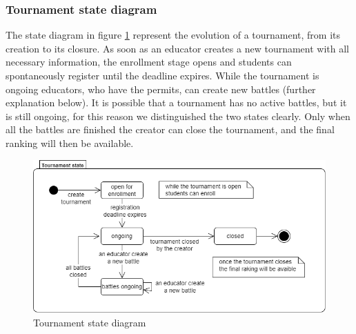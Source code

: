 \subsubsection*{Tournament state diagram}
The state diagram in figure \ref{fig:tournament_state} represent the evolution of a tournament, from its creation to its closure. \newline
As soon as an educator creates a new tournament with all necessary information, the enrollment stage opens and students can spontaneously register until the deadline expires. \newline
While the tournament is ongoing educators, who have the permits, can create new battles (further explanation below). It is possible that a tournament has no active battles, but it is still ongoing, for this reason we distinguished the two states clearly. \newline
Only when all the battles are finished the creator can close the tournament, and the final ranking will then be available.
\begin{figure}[H]
    \centering
    \includegraphics[scale=0.5]{images/tournament_state.png}
    \caption{Tournament state diagram}
    \label{fig:tournament_state}
\end{figure}

